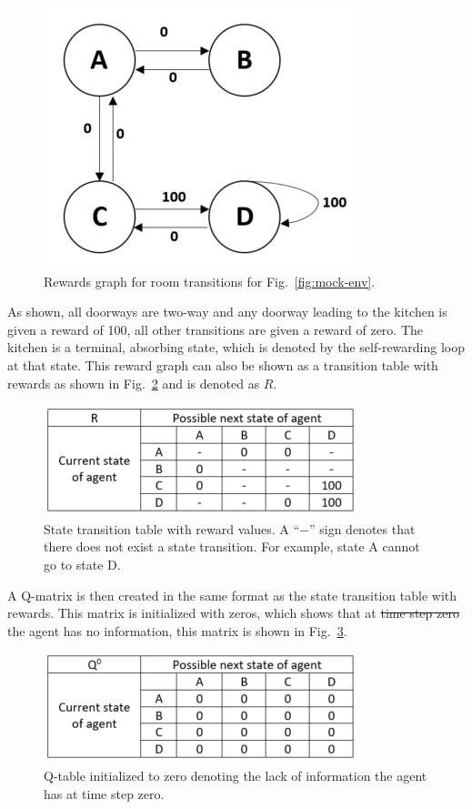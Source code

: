 \documentclass[12pt,american]{report}
\providecommand{\DIFaddtex}[1]{{\protect\color{blue}\uwave{#1}}} %
\providecommand{\DIFdeltex}[1]{{\protect\color{red}\sout{#1}}}                      %
\providecommand{\DIFaddbegin}{} %
\providecommand{\DIFaddend}{} %
\providecommand{\DIFdelbegin}{} %
\providecommand{\DIFdelend}{} %
\providecommand{\DIFadd}[1]{\texorpdfstring{\DIFaddtex{#1}}{#1}} %
\providecommand{\DIFdel}[1]{\texorpdfstring{\DIFdeltex{#1}}{}} %
\newcommand{\DIFscaledelfig}{0.5}
\newlength{\DIFdelgraphicswidth} %
\newlength{\DIFdelgraphicsheight} %
\newcommand{\DIFaddincludegraphics}[2][]{{\color{blue}\fbox{\DIFOincludegraphics[#1]{#2}}}} %
\newcommand{\DIFdelincludegraphics}[2][]{%
\sbox{\DIFdelgraphicsbox}{\DIFOincludegraphics[#1]{#2}}%
\settoboxwidth{\DIFdelgraphicswidth}{\DIFdelgraphicsbox} %
\settoboxtotalheight{\DIFdelgraphicsheight}{\DIFdelgraphicsbox} %
\scalebox{\DIFscaledelfig}{%
\parbox[b]{\DIFdelgraphicswidth}{\usebox{\DIFdelgraphicsbox}\\[-\baselineskip] \rule{\DIFdelgraphicswidth}{0em}}\llap{\resizebox{\DIFdelgraphicswidth}{\DIFdelgraphicsheight}{%
\setlength{\unitlength}{\DIFdelgraphicswidth}%
\begin{picture}(1,1)%
\thicklines\linethickness{2pt} %
{\color[rgb]{1,0,0}\put(0,0){\framebox(1,1){}}}%
{\color[rgb]{1,0,0}\put(0,0){\line( 1,1){1}}}%
{\color[rgb]{1,0,0}\put(0,1){\line(1,-1){1}}}%
\end{picture}%
}\hspace*{3pt}}} %
} %
\DeclareRobustCommand{\DIFaddbegin}{\DIFOaddbegin \let\includegraphics\DIFaddincludegraphics} %
\DeclareRobustCommand{\DIFaddend}{\DIFOaddend \let\includegraphics\DIFOincludegraphics} %
\DeclareRobustCommand{\DIFdelbegin}{\DIFOdelbegin \let\includegraphics\DIFdelincludegraphics} %
\DeclareRobustCommand{\DIFdelend}{\DIFOaddend \let\includegraphics\DIFOincludegraphics} %
\begin{document}
\begin{figure}
\centering
\includegraphics[scale=1]{images/mock-env-rewards.png}
\caption{Rewards graph for room transitions for Fig.~\ref{fig:mock-env}.}
\label{fig:mock-env-rewards}
\end{figure}
As shown, all doorways are two-way and any doorway leading to the kitchen is given a reward of 100, all other transitions are given a reward of zero.  The kitchen is a terminal, absorbing state, which is denoted by the self-rewarding loop at that state.  This reward graph can also be shown as a transition table with rewards as shown in Fig.~\ref{fig:q-mock-env-table} and is denoted as $R$. 
\begin{figure}
\centering
\includegraphics[scale=1.5]{images/q-mock-env-table.png}
\caption{State transition table with reward values. A ``$-$'' sign denotes that there does not exist a state transition. For example, state A cannot go to state D.}
\label{fig:q-mock-env-table}
\end{figure}
A Q-matrix is then created in the same format as the state transition table with rewards.  This matrix is initialized with zeros, which shows that at \DIFdelbegin \DIFdel{time step zero }\DIFdelend \DIFaddbegin \DIFadd{iteration zero ($Q^{0}$) }\DIFaddend the agent has no information, this matrix is shown in Fig.~\ref{fig:mock-q-table}.
\begin{figure}
\centering
\includegraphics[scale=1.5]{images/mock-q-table.png}
\caption{Q-table initialized to zero denoting the lack of information the agent has at time step zero.}
\label{fig:mock-q-table}
\end{figure}
\end{document}
